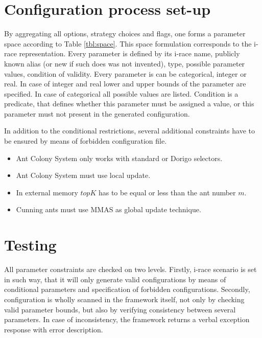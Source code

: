 \documentclass[11pt,a4paper,oneside]{book}
\begin{document}
\section{Configuration process set-up}

By aggregating all options, strategy choices and flags, one forms a parameter space according to Table \ref{tbl:space}. This space formulation corresponds to the i-race representation. Every parameter is defined by its i-race name, publicly known alias (or new if such does was not invented), type, possible parameter values, condition of validity. Every parameter is can be categorical, integer or real. In case of integer and real lower and upper bounds of the parameter are specified. In case of categorical all possible values are listed. Condition is a predicate, that defines whether this parameter must be assigned a value, or this parameter must not present in the generated configuration.


In addition to the conditional restrictions, several additional constraints have to be ensured by means of forbidden configuration file.

\begin{itemize}
\item Ant Colony System only works with standard or Dorigo selectors.

\item Ant Colony System must use local update.

\item In external memory $topK$ has to be equal or less than the ant number $m$.

\item Cunning ants must use MMAS as global update technique.
\end{itemize}


\section{Testing}


All parameter constraints are checked on two levels. Firstly, i-race scenario is set in such way, that it will only generate valid configurations by means of conditional parameters and specification of forbidden configurations. Secondly, configuration is wholly scanned in the framework itself, not only by checking valid parameter bounds, but also by verifying consistency between several parameters. In case of inconsistency, the framework returns a verbal exception response with error description.
\end{document}
